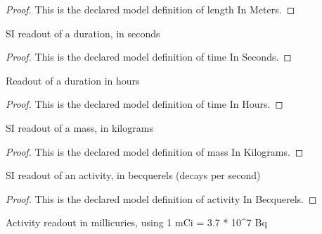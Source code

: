 \begin{proof}
  This is the declared model definition of length In Meters.
\end{proof}
\begin{definition}
  \label{def:physics:phyx-mini-0619:phyxmini0619-timeinseconds}
  SI readout of a duration, in seconds
\end{definition}
\begin{proof}
  This is the declared model definition of time In Seconds.
\end{proof}
\begin{definition}
  \label{def:physics:phyx-mini-0619:phyxmini0619-timeinhours}
  Readout of a duration in hours
\end{definition}
\begin{proof}
  This is the declared model definition of time In Hours.
\end{proof}
\begin{definition}
  \label{def:physics:phyx-mini-0619:phyxmini0619-massinkilograms}
  SI readout of a mass, in kilograms
\end{definition}
\begin{proof}
  This is the declared model definition of mass In Kilograms.
\end{proof}
\begin{definition}
  \label{def:physics:phyx-mini-0619:phyxmini0619-activityinbecquerels}
  SI readout of an activity, in becquerels (decays per second)
\end{definition}
\begin{proof}
  This is the declared model definition of activity In Becquerels.
\end{proof}
\begin{definition}
  \label{def:physics:phyx-mini-0619:phyxmini0619-activityinmillicuries}
  Activity readout in millicuries, using 1 mCi = 3.7 * 10\textasciicircum{}7 Bq
\end{definition}
